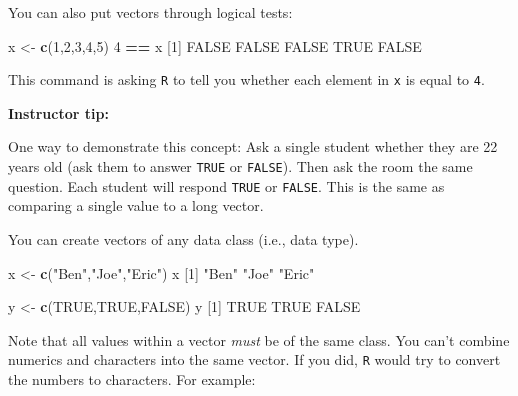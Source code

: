 \documentclass[
]{book}
\newenvironment{Shaded}{\begin{snugshade}}{\end{snugshade}}
\newcommand{\DecValTok}[1]{\textcolor[rgb]{0.00,0.00,0.81}{#1}}
\newcommand{\KeywordTok}[1]{\textcolor[rgb]{0.13,0.29,0.53}{\textbf{#1}}}
\newcommand{\NormalTok}[1]{#1}
\newcommand{\OperatorTok}[1]{\textcolor[rgb]{0.81,0.36,0.00}{\textbf{#1}}}
\newcommand{\OtherTok}[1]{\textcolor[rgb]{0.56,0.35,0.01}{#1}}
\newcommand{\StringTok}[1]{\textcolor[rgb]{0.31,0.60,0.02}{#1}}
\begin{document}
You can also put vectors through logical tests:

\begin{Shaded}
\begin{Highlighting}[]
\NormalTok{x <-}\StringTok{ }\KeywordTok{c}\NormalTok{(}\DecValTok{1}\NormalTok{,}\DecValTok{2}\NormalTok{,}\DecValTok{3}\NormalTok{,}\DecValTok{4}\NormalTok{,}\DecValTok{5}\NormalTok{)}
\DecValTok{4} \OperatorTok{==}\StringTok{ }\NormalTok{x}
\NormalTok{[}\DecValTok{1}\NormalTok{] }\OtherTok{FALSE} \OtherTok{FALSE} \OtherTok{FALSE}  \OtherTok{TRUE} \OtherTok{FALSE}
\end{Highlighting}
\end{Shaded}

This command is asking \texttt{R} to tell you whether each element in \texttt{x} is equal to \texttt{4}.

\leavevmode\hypertarget{tip-text}{}%
\textbf{Instructor tip:}

One way to demonstrate this concept: Ask a single student whether they are 22 years old (ask them to answer \texttt{TRUE} or \texttt{FALSE}). Then ask the room the same question. Each student will respond \texttt{TRUE} or \texttt{FALSE}. This is the same as comparing a single value to a long vector.

You can create vectors of any data class (i.e., data type).

\begin{Shaded}
\begin{Highlighting}[]
\NormalTok{x <-}\StringTok{ }\KeywordTok{c}\NormalTok{(}\StringTok{"Ben"}\NormalTok{,}\StringTok{"Joe"}\NormalTok{,}\StringTok{"Eric"}\NormalTok{) }
\NormalTok{x}
\NormalTok{[}\DecValTok{1}\NormalTok{] }\StringTok{"Ben"}  \StringTok{"Joe"}  \StringTok{"Eric"}
\end{Highlighting}
\end{Shaded}

\begin{Shaded}
\begin{Highlighting}[]
\NormalTok{y <-}\StringTok{ }\KeywordTok{c}\NormalTok{(}\OtherTok{TRUE}\NormalTok{,}\OtherTok{TRUE}\NormalTok{,}\OtherTok{FALSE}\NormalTok{)}
\NormalTok{y}
\NormalTok{[}\DecValTok{1}\NormalTok{]  }\OtherTok{TRUE}  \OtherTok{TRUE} \OtherTok{FALSE}
\end{Highlighting}
\end{Shaded}

Note that all values within a vector \emph{must} be of the same class. You can't combine numerics and characters into the same vector. If you did, \texttt{R} would try to convert the numbers to characters. For example:
\end{document}
